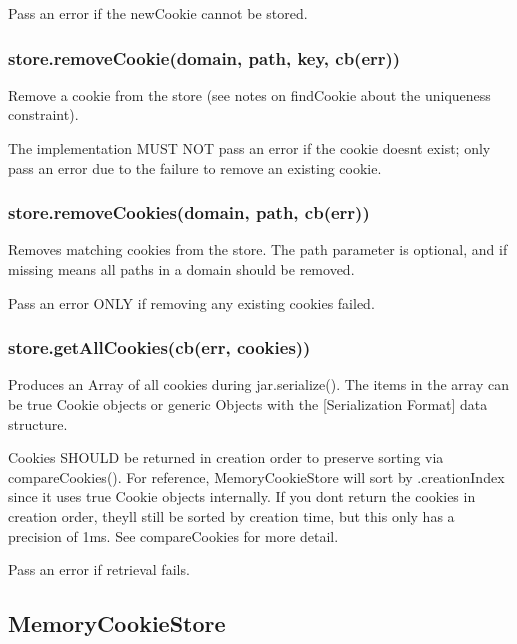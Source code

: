 Pass an error if the new\+Cookie cannot be stored.

\subsubsection*{{\ttfamily store.\+remove\+Cookie(domain, path, key, cb(err))}}

Remove a cookie from the store (see notes on {\ttfamily find\+Cookie} about the uniqueness constraint).

The implementation M\+U\+S\+T N\+O\+T pass an error if the cookie doesn\textquotesingle{}t exist; only pass an error due to the failure to remove an existing cookie.

\subsubsection*{{\ttfamily store.\+remove\+Cookies(domain, path, cb(err))}}

Removes matching cookies from the store. The {\ttfamily path} parameter is optional, and if missing means all paths in a domain should be removed.

Pass an error O\+N\+L\+Y if removing any existing cookies failed.

\subsubsection*{{\ttfamily store.\+get\+All\+Cookies(cb(err, cookies))}}

Produces an {\ttfamily Array} of all cookies during {\ttfamily jar.\+serialize()}. The items in the array can be true {\ttfamily Cookie} objects or generic {\ttfamily Object}s with the \mbox{[}Serialization Format\mbox{]} data structure.

Cookies S\+H\+O\+U\+L\+D be returned in creation order to preserve sorting via {\ttfamily compare\+Cookies()}. For reference, {\ttfamily Memory\+Cookie\+Store} will sort by {\ttfamily .creation\+Index} since it uses true {\ttfamily Cookie} objects internally. If you don\textquotesingle{}t return the cookies in creation order, they\textquotesingle{}ll still be sorted by creation time, but this only has a precision of 1ms. See {\ttfamily compare\+Cookies} for more detail.

Pass an error if retrieval fails.

\subsection*{Memory\+Cookie\+Store}

